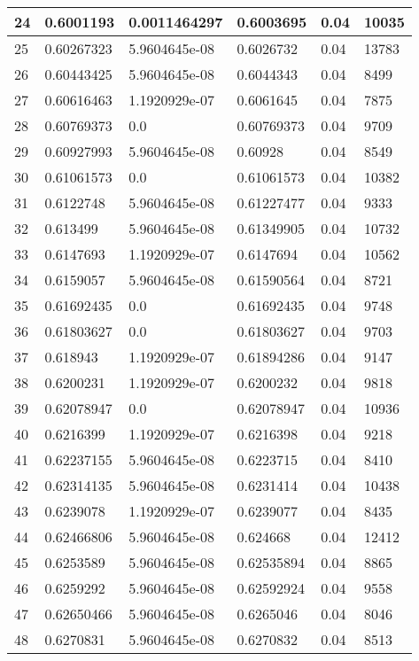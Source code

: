 \begin{longtable}{|l|l|l|l|l|l|}
24 & 0.6001193 & 0.0011464297 & 0.6003695 & 0.04 & 10035 \\ \hline 
25 & 0.60267323 & 5.9604645e-08 & 0.6026732 & 0.04 & 13783 \\ \hline 
26 & 0.60443425 & 5.9604645e-08 & 0.6044343 & 0.04 & 8499 \\ \hline 
27 & 0.60616463 & 1.1920929e-07 & 0.6061645 & 0.04 & 7875 \\ \hline 
28 & 0.60769373 & 0.0 & 0.60769373 & 0.04 & 9709 \\ \hline 
29 & 0.60927993 & 5.9604645e-08 & 0.60928 & 0.04 & 8549 \\ \hline 
30 & 0.61061573 & 0.0 & 0.61061573 & 0.04 & 10382 \\ \hline 
31 & 0.6122748 & 5.9604645e-08 & 0.61227477 & 0.04 & 9333 \\ \hline 
32 & 0.613499 & 5.9604645e-08 & 0.61349905 & 0.04 & 10732 \\ \hline 
33 & 0.6147693 & 1.1920929e-07 & 0.6147694 & 0.04 & 10562 \\ \hline 
34 & 0.6159057 & 5.9604645e-08 & 0.61590564 & 0.04 & 8721 \\ \hline 
35 & 0.61692435 & 0.0 & 0.61692435 & 0.04 & 9748 \\ \hline 
36 & 0.61803627 & 0.0 & 0.61803627 & 0.04 & 9703 \\ \hline 
37 & 0.618943 & 1.1920929e-07 & 0.61894286 & 0.04 & 9147 \\ \hline 
38 & 0.6200231 & 1.1920929e-07 & 0.6200232 & 0.04 & 9818 \\ \hline 
39 & 0.62078947 & 0.0 & 0.62078947 & 0.04 & 10936 \\ \hline 
40 & 0.6216399 & 1.1920929e-07 & 0.6216398 & 0.04 & 9218 \\ \hline 
41 & 0.62237155 & 5.9604645e-08 & 0.6223715 & 0.04 & 8410 \\ \hline 
42 & 0.62314135 & 5.9604645e-08 & 0.6231414 & 0.04 & 10438 \\ \hline 
43 & 0.6239078 & 1.1920929e-07 & 0.6239077 & 0.04 & 8435 \\ \hline 
44 & 0.62466806 & 5.9604645e-08 & 0.624668 & 0.04 & 12412 \\ \hline 
45 & 0.6253589 & 5.9604645e-08 & 0.62535894 & 0.04 & 8865 \\ \hline 
46 & 0.6259292 & 5.9604645e-08 & 0.62592924 & 0.04 & 9558 \\ \hline 
47 & 0.62650466 & 5.9604645e-08 & 0.6265046 & 0.04 & 8046 \\ \hline 
48 & 0.6270831 & 5.9604645e-08 & 0.6270832 & 0.04 & 8513 \\ \hline 

\end{longtable}
